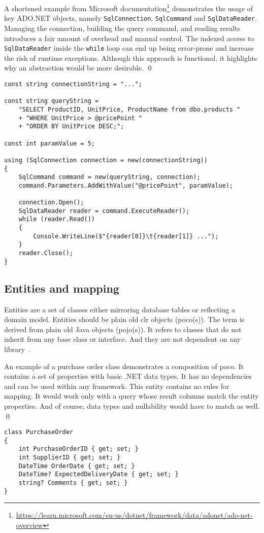 \begin{example}
\small
A shortened example from Microsoft documentation\footnote{\url{https://learn.microsoft.com/en-us/dotnet/framework/data/adonet/ado-net-overview}} demonstrates the usage of key ADO.NET objects, namely \texttt{SqlConnection}, \texttt{SqlCommand} and \texttt{SqlDataReader}. Managing the connection, building the query command, and reading results introduces a fair amount of overhead and manual control. The indexed access to \texttt{SqlDataReader} inside the \texttt{while} loop can end up being error-prone and increase the risk of runtime exceptions. Although this approach is functional, it highlights why an abstraction would be more desirable.
\qed

\begin{lstlisting}[language=CSharp]
const string connectionString = "...";

const string queryString =
    "SELECT ProductID, UnitPrice, ProductName from dbo.products "
    + "WHERE UnitPrice > @pricePoint "
    + "ORDER BY UnitPrice DESC;";

const int paramValue = 5;

using (SqlConnection connection = new(connectionString))
{
    SqlCommand command = new(queryString, connection);
    command.Parameters.AddWithValue("@pricePoint", paramValue);

    connection.Open();
    SqlDataReader reader = command.ExecuteReader();
    while (reader.Read())
    {
        Console.WriteLine($"{reader[0]}\t{reader[1]} ...");
    }
    reader.Close();
}
\end{lstlisting}
\end{example}

\subsection{Entities and mapping}
Entities are a set of classes either mirroring database tables or reflecting a domain model. Entities should be plain old \acrshort{clr} objects (\acrshort{poco}(s)). The term is derived from plain old Java objects (\acrshort{pojo}(s)). It refers to classes that do not inherit from any base class or interface. And they are not dependent on any library~\cite{Fowler2003POJO}.

\begin{example}
\small
An example of a purchase order class demonstrates a composition of \acrshort{poco}. It contains a set of properties with basic .NET data types. It has no dependencies and can be used within any framework. This entity contains no rules for mapping. It would work only with a query whose result columns match the entity properties. And of course, data types and nullability would have to match as well.
\qed
\begin{lstlisting}[language=CSharp]
class PurchaseOrder
{
    int PurchaseOrderID { get; set; }
    int SupplierID { get; set; }
    DateTime OrderDate { get; set; }
    DateTime? ExpectedDeliveryDate { get; set; }
    string? Comments { get; set; }
}
\end{lstlisting}
\end{example}

